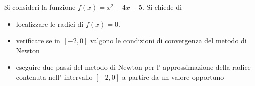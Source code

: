 Si consideri la funzione $f(x)=x^2-4x-5$.
Si chiede di
\begin{itemize}
\item  localizzare le radici di $f(x)=0$.
\item verificare se in $[-2,0]$ valgono le condizioni di convergenza del metodo di Newton
    \item eseguire due passi del metodo di Newton per l' approssimazione della radice  contenuta nell' intervallo $[-2,0]$ a partire da un valore opportuno
\end{itemize}
